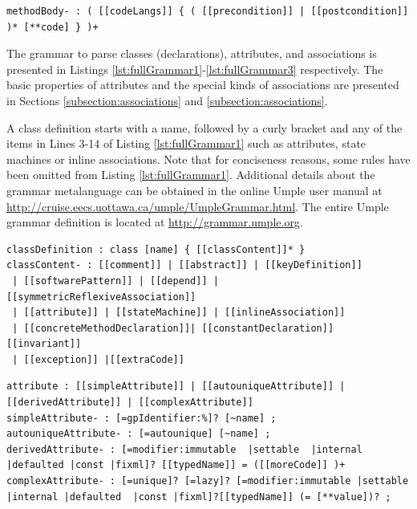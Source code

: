 \begin{lstlisting}[language={grammar}, label=lst:grammarExtra,caption=Grammar for Umple classes]
methodBody- : ( [[codeLangs]] { ( [[precondition]] | [[postcondition]] )* [**code] } )+
\end{lstlisting}

The grammar to parse classes (declarations), attributes, and associations is presented in Listings \ref{lst:fullGrammar1}-\ref{lst:fullGrammar3} respectively. The basic properties of attributes and the special kinds of associations are presented in Sections \ref{subsection:associations} and \ref{subsection:associations}.

A class definition starts with a name, followed by a curly bracket and any of the items in Lines 3-14 of Listing \ref{lst:fullGrammar1} such as attributes, state machines or inline associations. Note that for conciseness reasons, some rules have been omitted from Listing \ref{lst:fullGrammar1}. Additional details about the grammar metalanguage can be obtained in the online Umple user manual at \url{http://cruise.eecs.uottawa.ca/umple/UmpleGrammar.html}. The entire Umple grammar definition is located at \url{http://grammar.umple.org}.


\begin{lstlisting}[language={grammar}, label=lst:fullGrammar1,caption=Umple Grammar for classes]
classDefinition : class [name] { [[classContent]]* }
classContent- : [[comment]] | [[abstract]] | [[keyDefinition]] 
 | [[softwarePattern]] | [[depend]] | [[symmetricReflexiveAssociation]]
 | [[attribute]] | [[stateMachine]] | [[inlineAssociation]] 
 | [[concreteMethodDeclaration]]| [[constantDeclaration]] [[invariant]] 
 | [[exception]] |[[extraCode]]
\end{lstlisting}

\begin{lstlisting}[language={grammar}, label=lst:fullGrammar2,caption=Umple Grammar for attributes]
attribute : [[simpleAttribute]] | [[autouniqueAttribute]] | [[derivedAttribute]] | [[complexAttribute]]
simpleAttribute- : [=gpIdentifier:%]? [~name] ;
autouniqueAttribute- : [=autounique] [~name] ;
derivedAttribute- : [=modifier:immutable  |settable  |internal |defaulted |const |fixml]? [[typedName]] = ([[moreCode]] )+
complexAttribute- : [=unique]? [=lazy]? [=modifier:immutable |settable |internal |defaulted  |const |fixml]?[[typedName]] (= [**value])? ;
\end{lstlisting}

